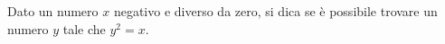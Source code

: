 Dato un numero $x$ negativo e diverso da zero,
si dica se è possibile trovare 
un numero $y$ tale che $y^2=x$.